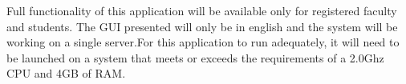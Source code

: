 
\label{constraints}

Full functionality of this application will be available only for registered faculty and students. The GUI presented will only be in english and the system will be working on a single server.For this application to run adequately, it will need to be launched on a system that meets or exceeds the requirements of a 2.0Ghz CPU and 4GB of RAM.


